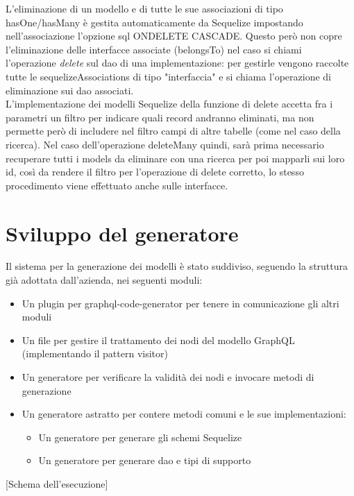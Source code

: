 \documentclass[a4paper, 12pt]{scrartcl}
\begin{document}
      L'eliminazione di un modello e di tutte le sue associazioni di tipo hasOne/hasMany è gestita automaticamente da Sequelize impostando nell'associazione l'opzione sql ONDELETE CASCADE.
      Questo però non copre l'eliminazione delle interfacce associate (belongsTo) nel caso si chiami l'operazione \emph{delete} sul dao di una implementazione: per gestirle vengono raccolte tutte le sequelizeAssociations di tipo "interfaccia" e si chiama l'operazione di eliminazione sui dao associati.\\

      L'implementazione dei modelli Sequelize della funzione di delete accetta fra i parametri un filtro per indicare quali record andranno eliminati, ma non permette però di includere nel filtro campi di altre tabelle (come nel caso della ricerca).
      Nel caso dell'operazione deleteMany quindi, sarà prima necessario recuperare tutti i models da eliminare con una ricerca per poi mapparli sui loro id, così da rendere il filtro per l'operazione di delete corretto, lo stesso procedimento viene effettuato anche sulle interfacce.

    \newpage
    \section*{Sviluppo del generatore}
      Il sistema per la generazione dei modelli è stato suddiviso, seguendo la struttura già adottata dall'azienda, nei seguenti moduli:

      \begin{itemize}
        \item Un plugin per graphql-code-generator per tenere in comunicazione gli altri moduli
        \item Un file per gestire il trattamento dei nodi del modello GraphQL (implementando il pattern visitor)
        \item Un generatore per verificare la validità dei nodi e invocare metodi di generazione
        \item Un generatore astratto per contere metodi comuni e le sue implementazioni:
        \begin{itemize}
          \item Un generatore per generare gli schemi Sequelize
          \item Un generatore per generare dao e tipi di supporto
        \end{itemize}
      \end{itemize}

      [Schema dell'esecuzione]
\end{document}
